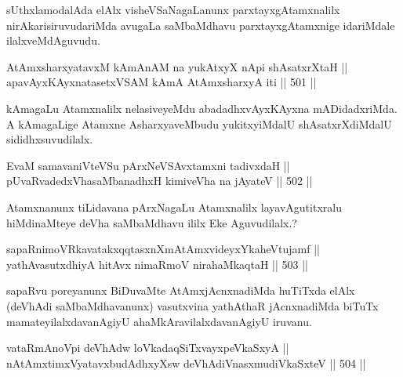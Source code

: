\begin{artha}
sUthxlamodalAda elAlx visheVSaNagaLanunx parxtayxgAtamxnalilx
nirAkarisi\-ruvudariMda avugaLa saMbaMdhavu parxtayxgAtamxnige
idariMdale ilalxveMdAguvudu.
\end{artha}


\begin{shl}
AtAmxsharxyatavxM kAmAnAM na yukAtxyX nApi shAsatxrXtaH || \\
apavAyxKAyxnatasetxVSAM kAmA AtAmxsharxyA iti \hfill || 501 ||  
\end{shl}

\begin{artha}
kAmagaLu Atamxnalilx nelasiveyeMdu abadadhxvAyxKAyxna mADidadx\-riMda. A
kAmagaLige Atamxne AsharxyaveMbudu yukitxyiMdalU shAsatxrXdiMdalU sididhxsuvudilalx.
\end{artha}


\begin{shl}
EvaM samavaniVteVSu pArxNeVSAvxtamxni tadivxdaH ||  \\
pUvaRvadedxVhasaMbanadhxH kimiveVha na jAyateV \hfill || 502 ||  
\end{shl}

\begin{artha}
Atamxnanunx tiLidavana pArxNagaLu Atamxnalilx layavAgutitxralu\break
hiMdinaMteye deVha saMbaMdhavu ililx Eke Aguvudilalx.?
\end{artha}


\begin{shl}
sapaRnimoVRkavatakxqqtasxnXmAtAmxvideyxYkaheVtujamf || \\
yathAvasutxdhiyA hitAvx nimaRmoV nirahaMkaqtaH \hfill || 503 ||  
\end{shl}

\begin{artha}
sapaRvu poreyanunx BiDuvaMte AtAmxjAcnxnadiMda huTiTxda elAlx (deVhAdi saMbaMdhavanunx) vasutxvina yathAthaR jAcnxnadiMda biTuTx mamateyilalxdavanAgiyU ahaMkAravilalxdavanAgiyU iruvanu.
\end{artha}


\begin{shl}
vataRmAnoV\s pi deVhAdw loVkadaqSiTxvayxpeVkaSxyA ||  \\
nA\s \s tAmx\s \s timxVyatavxbudAdhxyX\s sw deVhAdiVnasxmudiVkaSxteV \hfill || 504 || 
\end{shl}

